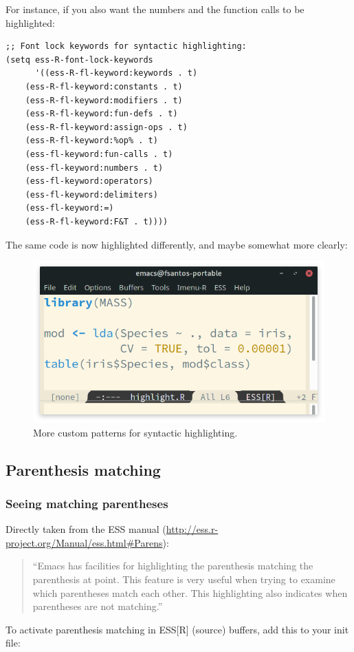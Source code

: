 \documentclass[11pt]{article}
\begin{document}
For instance, if you also want the numbers and the function calls to be highlighted:

\begin{verbatim}
;; Font lock keywords for syntactic highlighting:
(setq ess-R-font-lock-keywords
      '((ess-R-fl-keyword:keywords . t)
	(ess-R-fl-keyword:constants . t)
	(ess-R-fl-keyword:modifiers . t)
	(ess-R-fl-keyword:fun-defs . t)
	(ess-R-fl-keyword:assign-ops . t)
	(ess-R-fl-keyword:%op% . t)
	(ess-fl-keyword:fun-calls . t)
	(ess-fl-keyword:numbers . t)
	(ess-fl-keyword:operators)
	(ess-fl-keyword:delimiters)
	(ess-fl-keyword:=)
	(ess-R-fl-keyword:F&T . t))))
\end{verbatim}

The same code is now highlighted differently, and maybe somewhat more clearly:

\begin{figure}[htbp]
\centering
\includegraphics[width=0.55 \textwidth]{./images/highlight_custom.png}
\caption{\label{fig:org8ffbd39}More custom patterns for syntactic highlighting.}
\end{figure}

\subsection{Parenthesis matching}
\label{sec:org209103b}
\subsubsection{Seeing matching parentheses}
\label{sec:orgf46544f}
Directly taken from the ESS manual (\url{http://ess.r-project.org/Manual/ess.html\#Parens}):

\begin{quote}
``Emacs has facilities for highlighting the parenthesis matching the parenthesis at point. This feature is very useful when trying to examine which parentheses match each other. This highlighting also indicates when parentheses are not matching.''
\end{quote}

To activate parenthesis matching in ESS[R] (source) buffers, add this to your init file:
\end{document}
